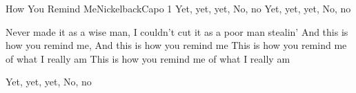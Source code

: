 \begin{song}{How You Remind Me}{Nickelback}{Capo 1}
  Yet, yet, yet, No, no
  Yet, yet, yet, No, no


Never made it as a wise man, I couldn't cut it as a poor man stealin'
And this is how you remind me, And this is how you remind me
 This is how you remind me of what I really am
 This is how you remind me of what I really am


  Yet,  yet,  yet, No, no
\end{song}
